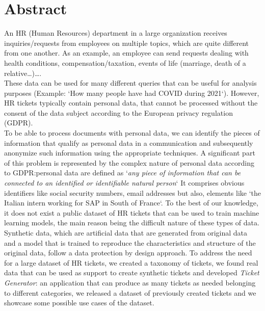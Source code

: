 \chapter*{Abstract}

An HR (Human Resources) department in a large organization receives inquiries\slash requests from employees on multiple topics, which are quite different from one another. As an example, an employee can send requests dealing with health conditions, compensation/taxation, events of life (marriage, death of a relative\dots)\dots. \\
These data can be used for many different queries that can be useful for analysis purposes (Example: `How many people have had COVID during 2021`). However, HR tickets typically contain personal data, that cannot be processed without the consent of the data subject according to the European privacy regulation (GDPR). \\
To be able to process documents with personal data, we can identify the pieces of information that qualify as personal data in a communication and subsequently anonymize such information using the appropriate techniques.
A significant part of this problem is represented by the complex nature of personal data according to GDPR:\@ personal data are defined as `\textit{any piece of information that can be connected to an identified or identifiable natural person}` It comprises obvious identifiers like social security numbers, email addresses but also, elements like `the Italian intern working for SAP in South of France`.
To the best of our knowledge, it does not exist a public dataset of HR tickets that can be used to train machine learning models, the main reason being the difficult nature of these types of data. Synthetic data, which are artificial data that are generated from original data and a model that is trained to reproduce the characteristics and structure of the original data, follow a data protection by design approach.
To address the need for a large dataset of HR tickets, we created a taxonomy of tickets, we found real data that can be used as support to create synthetic tickets and developed \textit{Ticket Generator}: an application that can produce as many tickets as needed belonging to different categories, we released a dataset of previously created tickets and we showcase some possible use cases of the dataset.

